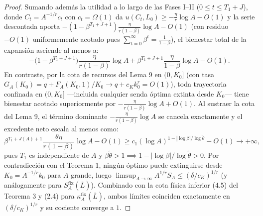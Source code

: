 \documentclass[11pt,letterpaper]{article}
\theoremstyle{plain}
\begin{document}
\begin{proof}
Sumando además la utilidad a lo largo de las Fases I--II ($0\le t \le T_1+J$), donde $C_t=A^{-1/r}c_t$ con $c_t=\Omega(1)$ da $u(C_t,L_0)\ge -\frac{\eta}{r}\log A - O(1)$ y la serie descontada aporta $-(1-\beta^{T_1+J+1})\frac{\eta}{r(1-\beta)}\log A - O(1)$ (con residuo $-O(1)$ uniformemente acotado pues $\sum_{t=0}^\infty \beta^t = \frac{1}{1-\beta}$), el bienestar total de la expansión asciende al menos a:
\[
-\big(1-\beta^{T_1+J+1}\big)\frac{\eta}{r(1-\beta)}\log A + \beta^{T_1+J+1}\frac{\eta}{1-\beta}\log A - O(1).
\]
En contraste, por la cota de recursos del Lema 9 en $(0,K_0]$ (con tasa $G_A(K_0)=q+F_A(K_0,1)/K_0 \to q+c_K k_0^r=O(1)$), toda trayectoria confinada en $(0,K_0]$ ---incluida cualquier senda óptima extinta desde $K_0$--- tiene bienestar acotado superiormente por $-\frac{\eta}{r(1-\beta)}\log A + O(1)$. Al sustraer la cota del Lema 9, el término dominante $-\frac{\eta}{r(1-\beta)}\log A$ se cancela exactamente y el excedente neto escala al menos como:
\[
\beta^{T_1+J(A)+1}\frac{\theta\eta}{r(1-\beta)}\log A - O(1) \ge c_1(\log A)^{1-|\log\beta|/\log\tilde{\theta}} - O(1) \to +\infty,
\]
pues $T_1$ es independiente de $A$ y $\beta\tilde{\theta}>1\implies 1-|\log\beta|/\log\tilde{\theta}>0$. Por contradicción con el Teorema 1, ningún óptimo puede extinguirse desde $K_0=A^{-1/r}k_0$ para $A$ grande, luego $\limsup_{A\to\infty}A^{1/r}S_A\le (\delta/c_K)^{1/r}$ (y análogamente para $S_A^{\mathrm{fix}}(\overline{L})$). Combinado con la cota física inferior (4.5) del Teorema 3 y (2.4) para $\kappa_A^{\mathrm{fix}}(\overline{L})$, ambos límites coinciden exactamente en $(\delta/c_K)^{1/r}$ y su cociente converge a $1$.


\end{proof}
\end{document}
